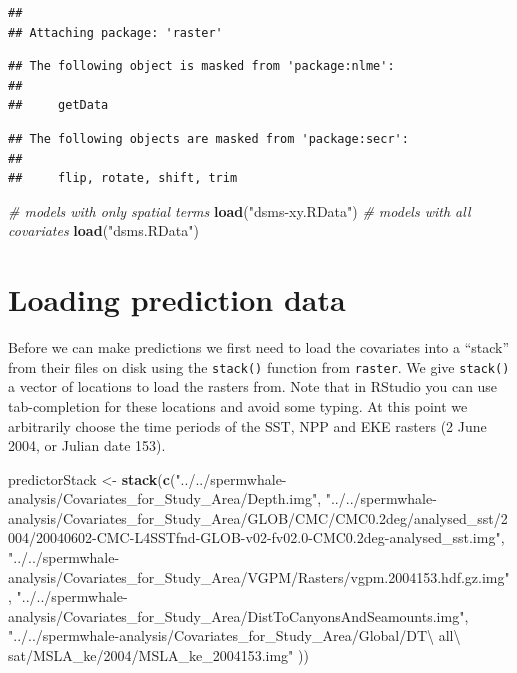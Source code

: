 \documentclass[]{book}
\newenvironment{Shaded}{\begin{snugshade}}{\end{snugshade}}
\newcommand{\KeywordTok}[1]{\textcolor[rgb]{0.13,0.29,0.53}{\textbf{#1}}}
\newcommand{\StringTok}[1]{\textcolor[rgb]{0.31,0.60,0.02}{#1}}
\newcommand{\CommentTok}[1]{\textcolor[rgb]{0.56,0.35,0.01}{\textit{#1}}}
\newcommand{\NormalTok}[1]{#1}
\theoremstyle{definition}
\theoremstyle{definition}
\theoremstyle{remark}
\begin{document}
\begin{verbatim}
## 
## Attaching package: 'raster'
\end{verbatim}

\begin{verbatim}
## The following object is masked from 'package:nlme':
## 
##     getData
\end{verbatim}

\begin{verbatim}
## The following objects are masked from 'package:secr':
## 
##     flip, rotate, shift, trim
\end{verbatim}

\begin{Shaded}
\begin{Highlighting}[]
\CommentTok{# models with only spatial terms}
\KeywordTok{load}\NormalTok{(}\StringTok{"dsms-xy.RData"}\NormalTok{)}
\CommentTok{# models with all covariates}
\KeywordTok{load}\NormalTok{(}\StringTok{"dsms.RData"}\NormalTok{)}
\end{Highlighting}
\end{Shaded}

\section{Loading prediction data}\label{loading-prediction-data}

Before we can make predictions we first need to load the covariates into
a ``stack'' from their files on disk using the \texttt{stack()} function
from \texttt{raster}. We give \texttt{stack()} a vector of locations to
load the rasters from. Note that in RStudio you can use tab-completion
for these locations and avoid some typing. At this point we arbitrarily
choose the time periods of the SST, NPP and EKE rasters (2 June 2004, or
Julian date 153).

\begin{Shaded}
\begin{Highlighting}[]
\NormalTok{predictorStack <-}\StringTok{ }\KeywordTok{stack}\NormalTok{(}\KeywordTok{c}\NormalTok{(}\StringTok{"../../spermwhale-analysis/Covariates_for_Study_Area/Depth.img"}\NormalTok{,}
                          \StringTok{"../../spermwhale-analysis/Covariates_for_Study_Area/GLOB/CMC/CMC0.2deg/analysed_sst/2004/20040602-CMC-L4SSTfnd-GLOB-v02-fv02.0-CMC0.2deg-analysed_sst.img"}\NormalTok{,}
                          \StringTok{"../../spermwhale-analysis/Covariates_for_Study_Area/VGPM/Rasters/vgpm.2004153.hdf.gz.img"}\NormalTok{,}
                          \StringTok{"../../spermwhale-analysis/Covariates_for_Study_Area/DistToCanyonsAndSeamounts.img"}\NormalTok{,}
                          \StringTok{"../../spermwhale-analysis/Covariates_for_Study_Area/Global/DT\textbackslash{} all\textbackslash{} sat/MSLA_ke/2004/MSLA_ke_2004153.img"}
\NormalTok{                          ))}
\end{Highlighting}
\end{Shaded}
\end{document}
